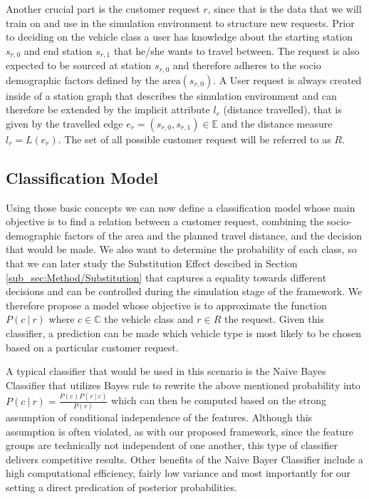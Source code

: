 Another crucial part is the customer request $r$, since that is the data that we will train on and use in the simulation
environment to structure new requests. Prior to deciding on the vehicle class a user has knowledge about
the starting station $s_{r, 0}$ and end station $s_{r, 1}$ that he/she wants to travel between. The request is also expected
to be sourced at station $s_{r, 0}$ and therefore adheres to the socio demographic factors defined by the $\text{area}(s_{r, 0})$.
A User request is always created inside of a station graph that describes the simulation environment and can therefore
be extended by the implicit attribute $l_r$ (distance travelled), that is given by the travelled edge $e_r = (s_{r, 0}, s_{r, 1}) \in \mathbb{E}$
and the distance measure $l_r = L(e_r)$. The set of all possible customer request will be referred to as $R$.

\subsection{Classification Model}
\label{sub_sec:Method/Class}

Using those basic concepts we can now define a classification model whose
main objective is to find a relation between a customer request, combining the socio-demographic factors of the area
and the planned travel distance, and the decision that would be made. We also want to determine the
probability of each class, so that we can later study the Substitution Effect descibed in Section \ref{sub_sec:Method/Substitution}
that captures a equality towards different decisions and can be controlled during the
simulation stage of the framework. We therefore propose a model whose objective is to
approximate the function $P(c \ | \ r)$ where $c \in \mathbb{C}$ the vehicle class and  $r \in R$ the request.
Given this classifier, a prediction can be made which vehicle type is most likely to be chosen based
on a particular customer request.

A typical classifier that would be used in this scenario is the Naive Bayes Classifier that utilizes
Bayes rule to rewrite the above mentioned probability into $P(c \ | \ r) = \frac{P(c)P(r \ | \ c)}{P(r)}$
which can then be computed based on the strong assumption of conditional independence of the features.
Although this assumption is often violated, as with our proposed framework, since the feature groups
are technically not independent of one another, this type of classifier delivers competitive results.
Other benefits of the Naive Bayer Classifier include a high computational efficiency, fairly low variance
and most importantly for our setting a direct predication of posterior probabilities. \cite{Webb2010}

